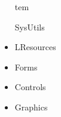 \documentclass{report}
\begin{document}
\begin{itemize}
tem \begin{ttfamily}SysUtils\end{ttfamily}\item \begin{ttfamily}LResources\end{ttfamily}\item \begin{ttfamily}Forms\end{ttfamily}\item \begin{ttfamily}Controls\end{ttfamily}\item \begin{ttfamily}Graphics\end{ttfamily}\it
\end{itemize}
\end{document}
